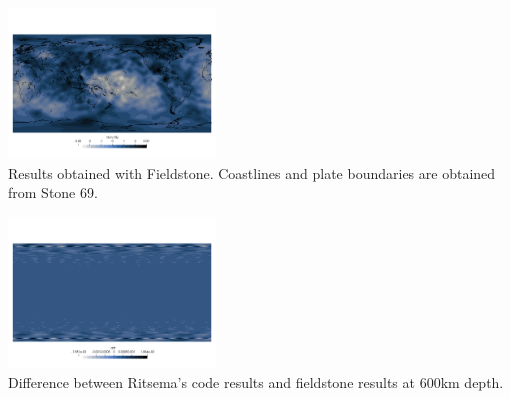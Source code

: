 \begin{center}
\includegraphics[width=5.5cm]{python_codes/fieldstone_85/images/fieldstone/fieldstone_S40RTS_2891km.png}\\
{\captionfont Results obtained with Fieldstone. Coastlines and plate boundaries are obtained from Stone 69.}
\end{center}

\begin{center}
\includegraphics[width=5.5cm]{python_codes/fieldstone_85/images/fieldstone/diff_600km_S40RTS.png}\\
{\captionfont Difference between Ritsema's code results and fieldstone results at 600\si{km} depth.}
\end{center}


